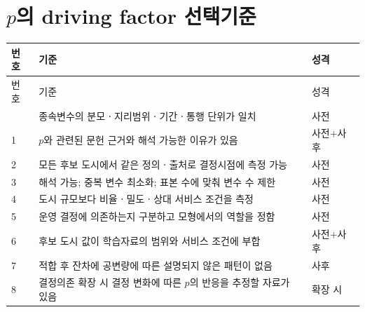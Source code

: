 \documentclass[10pt,a4paper]{article}
\begin{document}
\section{$p$의 driving factor 선택기준}
{\small
\begin{longtable}{@{}L{0.07\textwidth}L{0.72\textwidth}L{0.15\textwidth}@{}}
\toprule 번호 & 기준 & 성격\\
\midrule\endfirsthead
\toprule 번호 & 기준 & 성격\\
\midrule\endhead
\bottomrule{} & 종속변수의 분모ㆍ지리범위ㆍ기간ㆍ통행 단위가 일치 & 사전\\
1 & $p$와 관련된 문헌 근거와 해석 가능한 이유가 있음 & 사전+사후\\
2 & 모든 후보 도시에서 같은 정의ㆍ출처로 결정시점에 측정 가능 & 사전\\
3 & 해석 가능; 중복 변수 최소화; 표본 수에 맞춰 변수 수 제한 & 사전\\
4 & 도시 규모보다 비율ㆍ밀도ㆍ상대 서비스 조건을 측정 & 사전\\
5 & 운영 결정에 의존하는지 구분하고 모형에서의 역할을 정함 & 사전\\
6 & 후보 도시 값이 학습자료의 범위와 서비스 조건에 부합 & 사전+사후\\
7 & 적합 후 잔차에 공변량에 따른 설명되지 않은 패턴이 없음 & 사후\\
8 & 결정의존 확장 시 결정 변화에 따른 $p$의 반응을 추정할 자료가 있음 & 확장 시\\
\end{longtable}}
\end{document}
